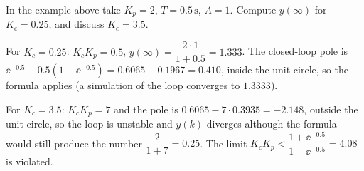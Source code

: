 \begin{problem}
In the example above take $K_p=2$, $T=0.5\,\mathrm{s}$, $A=1$. Compute $y(\infty)$ for $K_c=0.25$, and
discuss $K_c=3.5$.
\end{problem}
\begin{solution}
For $K_c=0.25$: $K_cK_p=0.5$, $y(\infty)=\dfrac{2\cdot1}{1+0.5}=1.333$. The closed-loop pole is
$\ee^{-0.5}-0.5(1-\ee^{-0.5})=0.6065-0.1967=0.410$, inside the unit circle, so the formula applies (a
simulation of the loop converges to $1.3333$).\par
For $K_c=3.5$: $K_cK_p=7$ and the pole is $0.6065-7\cdot0.3935=-2.148$, outside the unit circle, so the
loop is unstable and $y(k)$ diverges although the formula would still produce the number
$\dfrac{2}{1+7}=0.25$. The limit $K_cK_p<\dfrac{1+\ee^{-0.5}}{1-\ee^{-0.5}}=4.08$ is violated.
\end{solution}
